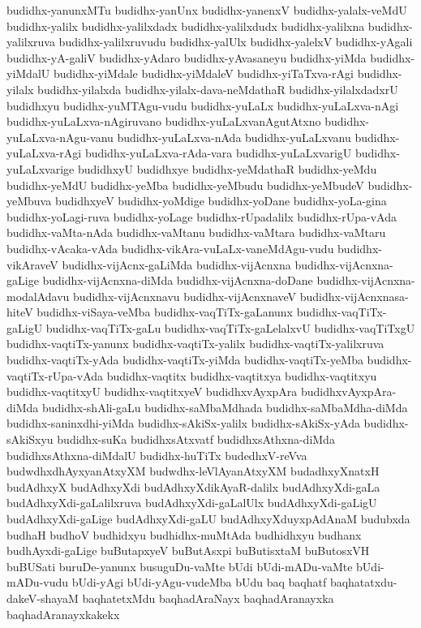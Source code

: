 {budidhx-yanunxMTu
budidhx-yanUnx
budidhx-yanenxV
budidhx-yalalx-veMdU
budidhx-yalilx
budidhx-yalilxdadx
budidhx-yalilxdudx
budidhx-yalilxna
budidhx-yalilxruva
budidhx-yalilxruvudu
budidhx-yalUlx
budidhx-yalelxV
budidhx-yAgali
budidhx-yA-galiV
budidhx-yAdaro
budidhx-yAvasaneyu
budidhx-yiMda
budidhx-yiMdalU
budidhx-yiMdale
budidhx-yiMdaleV
budidhx-yiTaTxva-rAgi
budidhx-yilalx
budidhx-yilalxda
budidhx-yilalx-dava-neMdathaR
budidhx-yilalxdadxrU
budidhxyu
budidhx-yuMTAgu-vudu
budidhx-yuLaLx
budidhx-yuLaLxva-nAgi
budidhx-yuLaLxva-nAgiruvano
budidhx-yuLaLxvanAgutAtxno
budidhx-yuLaLxva-nAgu-vanu
budidhx-yuLaLxva-nAda
budidhx-yuLaLxvanu
budidhx-yuLaLxva-rAgi
budidhx-yuLaLxva-rAda-vara
budidhx-yuLaLxvarigU
budidhx-yuLaLxvarige
budidhxyU
budidhxye
budidhx-yeMdathaR
budidhx-yeMdu
budidhx-yeMdU
budidhx-yeMba
budidhx-yeMbudu
budidhx-yeMbudeV
budidhx-yeMbuva
budidhxyeV
budidhx-yoMdige
budidhx-yoDane
budidhx-yoLa-gina
budidhx-yoLagi-ruva
budidhx-yoLage
budidhx-rUpadalilx
budidhx-rUpa-vAda
budidhx-vaMta-nAda
budidhx-vaMtanu
budidhx-vaMtara
budidhx-vaMtaru
budidhx-vAcaka-vAda
budidhx-vikAra-vuLaLx-vaneMdAgu-vudu
budidhx-vikAraveV
budidhx-vijAcnx-gaLiMda
budidhx-vijAcnxna
budidhx-vijAcnxna-gaLige
budidhx-vijAcnxna-diMda
budidhx-vijAcnxna-doDane
budidhx-vijAcnxna-modalAdavu
budidhx-vijAcnxnavu
budidhx-vijAcnxnaveV
budidhx-vijAcnxnasa-hiteV
budidhx-viSaya-veMba
budidhx-vaqTiTx-gaLanunx
budidhx-vaqTiTx-gaLigU
budidhx-vaqTiTx-gaLu
budidhx-vaqTiTx-gaLelalxvU
budidhx-vaqTiTxgU
budidhx-vaqtiTx-yanunx
budidhx-vaqtiTx-yalilx
budidhx-vaqtiTx-yalilxruva
budidhx-vaqtiTx-yAda
budidhx-vaqtiTx-yiMda
budidhx-vaqtiTx-yeMba
budidhx-vaqtiTx-rUpa-vAda
budidhx-vaqtitx
budidhx-vaqtitxya
budidhx-vaqtitxyu
budidhx-vaqtitxyU
budidhx-vaqtitxyeV
budidhxvAyxpAra
budidhxvAyxpAra-diMda
budidhx-shAli-gaLu
budidhx-saMbaMdhada
budidhx-saMbaMdha-diMda
budidhx-saninxdhi-yiMda
budidhx-sAkiSx-yalilx
budidhx-sAkiSx-yAda
budidhx-sAkiSxyu
budidhx-suKa
budidhxsAtxvatf
budidhxsAthxna-diMda
budidhxsAthxna-diMdalU
budidhx-huTiTx
budedhxV-reVva
budwdhxdhAyxyanAtxyXM
budwdhx-leVlAyanAtxyXM
budadhxyXnatxH
budAdhxyX
budAdhxyXdi
budAdhxyXdikAyaR-dalilx
budAdhxyXdi-gaLa
budAdhxyXdi-gaLalilxruva
budAdhxyXdi-gaLalUlx
budAdhxyXdi-gaLigU
budAdhxyXdi-gaLige
budAdhxyXdi-gaLU
budAdhxyXduyxpAdAnaM
budubxda
budhaH
budhoV
budhidxyu
budhidhx-muMtAda
budhidhxyu
budhanx
budhAyxdi-gaLige
buButapxyeV
buButAsxpi
buButisxtaM
buButosxVH
buBUSati
buruDe-yanunx
busuguDu-vaMte
bUdi
bUdi-mADu-vaMte
bUdi-mADu-vudu
bUdi-yAgi
bUdi-yAgu-vudeMba
bUdu
baq
baqhatf
baqhatatxdu-dakeV-shayaM
baqhatetxMdu
baqhadAraNayx
baqhadAranayxka
baqhadAranayxkakekx
}
